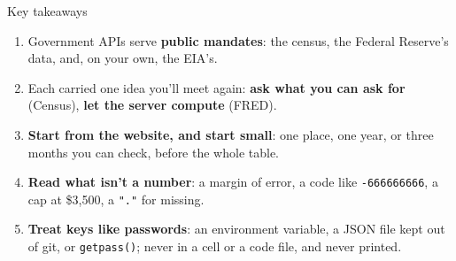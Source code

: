 \documentclass[9pt,aspectratio=169]{beamer}
\begin{document}
\begin{frame}{Key takeaways}
    \begin{enumerate}
        \item Government APIs serve \textbf{public mandates}: the census, the Federal Reserve's data, and, on your own, the EIA's.
        \item Each carried one idea you'll meet again: \textbf{ask what you can ask for} (Census), \textbf{let the server compute} (FRED).
        \item \textbf{Start from the website, and start small}: one place, one year, or three months you can check, before the whole table.
        \item \textbf{Read what isn't a number}: a margin of error, a code like \texttt{-666666666}, a cap at \$3,500, a \texttt{"."} for missing.
        \item \textbf{Treat keys like passwords}: an environment variable, a JSON file kept out of git, or \texttt{getpass()}; never in a cell or a code file, and never printed.
    \end{enumerate}
\end{frame}
\end{document}
